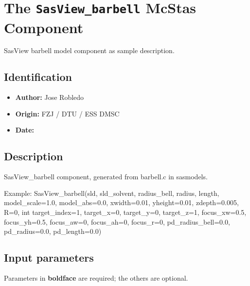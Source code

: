 \section{The \texttt{SasView\_barbell} McStas Component}
SasView barbell model component as sample description.

\subsection*{Identification}
\begin{itemize}
  \item \textbf{Author:} Jose Robledo
  \item \textbf{Origin:} FZJ / DTU / ESS DMSC
  \item \textbf{Date:} 
\end{itemize}

\subsection*{Description}
SasView\_barbell component, generated from barbell.c in sasmodels.

Example: SasView\_barbell(sld, sld\_solvent, radius\_bell, radius, length, model\_scale=1.0, model\_abs=0.0, xwidth=0.01, yheight=0.01, zdepth=0.005, R=0, int target\_index=1, target\_x=0, target\_y=0, target\_z=1, focus\_xw=0.5, focus\_yh=0.5, focus\_aw=0, focus\_ah=0, focus\_r=0, pd\_radius\_bell=0.0, pd\_radius=0.0, pd\_length=0.0)

\subsection*{Input parameters}
Parameters in \textbf{boldface} are required; the others are optional.

